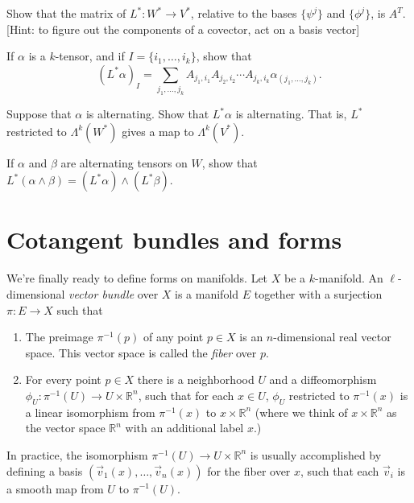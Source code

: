 \documentclass[12pt]{amsbook}
\newcommand{\R}{{\mathbb R}}
\theoremstyle{definition}
\begin{document}
 Show that the matrix of $L^*: W^* \to V^*$,
relative to the bases $\{\psi^j\}$ and $\{\phi^j\}$, is $A^T$. [Hint:
to figure out the components of a covector, act on a basis vector]

 If $\alpha$ is a $k$-tensor, and if 
$I=\{i_1,\ldots,i_k\}$, show that 
$$ (L^* \alpha)_I = \sum_{j_1,\ldots,j_k} A_{j_1,i_1} A_{j_2,i_2}\cdots
A_{j_k,i_k} \alpha_{(j_1,\ldots,j_k)}.
$$

 Suppose that $\alpha$ is alternating. Show 
that $L^*\alpha$ is alternating. That is, $L^*$ restricted to $\Lambda^k(W^*)$
gives a map to $\Lambda^k(V^*)$. 

 If $\alpha$ and $\beta$ are alternating tensors 
on $W$, show that $L^*(\alpha \wedge \beta) = (L^*\alpha) \wedge (L^* \beta)$.

\section{Cotangent bundles and forms}

We're finally ready to define forms on manifolds. Let $X$ be a $k$-manifold. 
An $\ell$-dimensional {\em vector bundle} over $X$ is a manifold $E$ 
together with a surjection
$\pi: E \to X$ such that 
\begin{enumerate}
\item The preimage $\pi^{-1}(p)$ of any point $p \in X$ is an $n$-dimensional
real vector space. This vector space is called the {\em fiber} over $p$. 
\item For every point $p \in X$ there is a neighborhood $U$ and 
a diffeomorphism $\phi_U: \pi^{-1}(U) \to U \times \R^n$, such that for
each $x \in U$, $\phi_U$ restricted to $\pi^{-1}(x)$ is a linear isomorphism
from $\pi^{-1}(x)$ to $x \times \R^n$ (where we think of $x \times \R^n$ as
the vector space $\R^n$ with an additional label $x$.)
\end{enumerate}
In practice, the isomorphism $\pi^{-1}(U) \to U \times \R^n$ is
usually accomplished by defining a basis $(\vec v_1(x), \ldots, \vec
v_n(x))$ for the fiber over $x$, such that each $\vec v_i$ is a smooth
map from $U$ to $\pi^{-1}(U)$.
\end{document}
